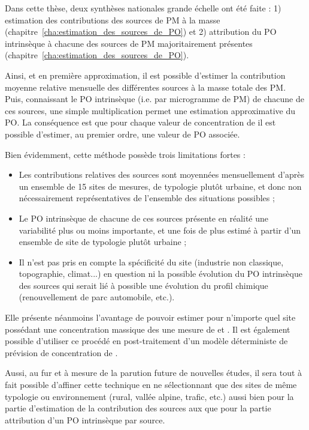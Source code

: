 Dans cette thèse, deux synthèses nationales grande échelle ont été faite : 1) estimation
des contributions des sources de PM à la masse \autocite{weberComparison2019}
(chapitre~\ref{cha:estimation_des_sources_de_PO}) et 2) attribution du PO intrinsèque à
chacune des sources de PM majoritairement présentes \autocite{weberSourceinprep.}
(chapitre~\ref{cha:estimation_des_sources_de_PO}).

Ainsi, et en première approximation, il est possible d'estimer la contribution moyenne
relative mensuelle des différentes sources à la masse totale des PM. Puis, connaissant le
PO intrinsèque (i.e. par microgramme de PM) de chacune de ces sources, une simple
multiplication permet une estimation approximative du PO.  La conséquence est que pour
chaque valeur de concentration de \PMdix{} il est possible d'estimer, au premier ordre,
une valeur de PO associée.

Bien évidemment, cette méthode possède trois limitations fortes : 
\begin{itemize}
    \item Les contributions relatives des sources sont moyennées mensuellement d'après un
        ensemble de 15 sites de mesures, de typologie plutôt urbaine, et donc non
        nécessairement représentatives de l'ensemble des situations possibles ;
    \item Le PO intrinsèque de chacune de ces sources présente en réalité une variabilité
        plus ou moins importante, et une fois de plus estimé à partir d'un ensemble de
        site de typologie plutôt urbaine ;
    \item Il n'est pas pris en compte la spécificité du site (industrie non classique, topographie, climat...) en question ni la possible
        évolution du PO intrinsèque des sources qui serait lié à possible une évolution du profil
        chimique (renouvellement de parc automobile, etc.).
\end{itemize}

Elle présente néanmoins l'avantage de pouvoir estimer pour n'importe quel site possédant
une concentration massique des \PMdix{} une mesure de \POAAv{} et \PODTTv. Il est
également possible d'utiliser ce procédé en post-traitement d'un modèle déterministe de
prévision de concentration de \PMdix.

Aussi, au fur et à mesure de la parution future de nouvelles études, il sera tout à fait possible d'affiner cette technique en ne sélectionnant que des sites de même typologie ou
environnement (rural, vallée alpine, trafic, etc.) aussi bien pour la partie d'estimation
de la contribution des sources aux \PMdix{} que pour la partie attribution d'un PO
intrinsèque par source.

